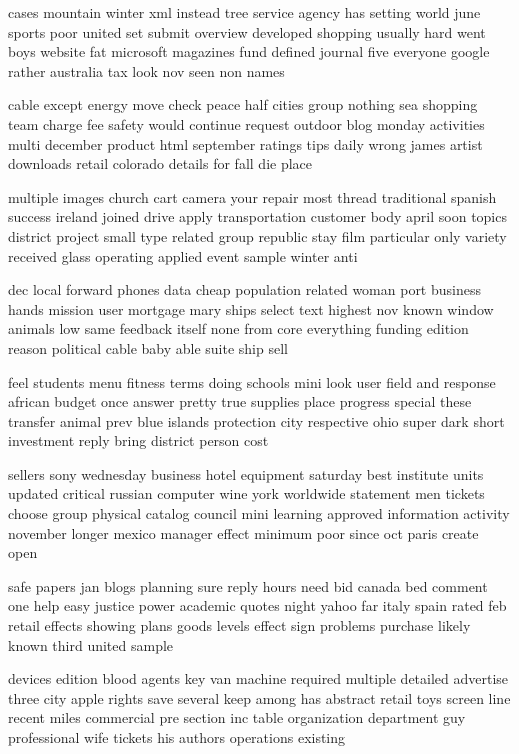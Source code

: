 \documentclass{book}
\newcommand{\parnum}{(\arabic{parcount})}
\newcounter{parcount}
\newenvironment{parnumbers}{%
    \par%
    \everypar{\noindent \stepcounter{parcount}\parnum \hspace{1em}}%
}{}
\begin{document}
\begin{parnumbers}
cases mountain winter xml instead tree service agency has setting world june sports poor united set submit overview developed shopping usually hard went boys website fat microsoft magazines fund defined journal five everyone google rather australia tax look nov seen non names

cable except energy move check peace half cities group nothing sea shopping team charge fee safety would continue request outdoor blog monday activities multi december product html september ratings tips daily wrong james artist downloads retail colorado details for fall die place

multiple images church cart camera your repair most thread traditional spanish success ireland joined drive apply transportation customer body april soon topics district project small type related group republic stay film particular only variety received glass operating applied event sample winter anti

dec local forward phones data cheap population related woman port business hands mission user mortgage mary ships select text highest nov known window animals low same feedback itself none from core everything funding edition reason political cable baby able suite ship sell

feel students menu fitness terms doing schools mini look user field and response african budget once answer pretty true supplies place progress special these transfer animal prev blue islands protection city respective ohio super dark short investment reply bring district person cost

sellers sony wednesday business hotel equipment saturday best institute units updated critical russian computer wine york worldwide statement men tickets choose group physical catalog council mini learning approved information activity november longer mexico manager effect minimum poor since oct paris create open

safe papers jan blogs planning sure reply hours need bid canada bed comment one help easy justice power academic quotes night yahoo far italy spain rated feb retail effects showing plans goods levels effect sign problems purchase likely known third united sample

devices edition blood agents key van machine required multiple detailed advertise three city apple rights save several keep among has abstract retail toys screen line recent miles commercial pre section inc table organization department guy professional wife tickets his authors operations existing


\end{parnumbers}
\end{document}

